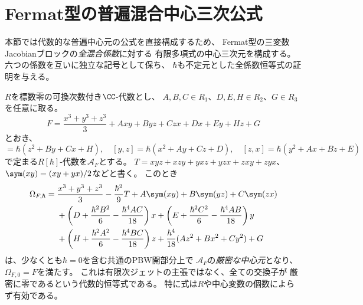 \section{Fermat型の普遍混合中心三次公式}
\label{sec:pg-fermat-mixed-universal}
本節では代数的な普遍中心元の公式を直接構成するため、
Fermat型の三変数Jacobianブロックの\emph{全混合係数}に対する
有限多項式の中心三次元を構成する。
六つの係数を互いに独立な記号として保ち、
$\hbar$も不定元とした全係数恒等式の証明を与える。

\begin{theorem}[普遍Fermat混合中心三次元]
\label{thm:pg-fermat-mixed-universal}
$R$を標数零の可換次数付き$\CC$-代数とし、
$A,B,C\in R_1$、$D,E,H\in R_2$、$G\in R_3$を任意に取る。
\begin{equation}
 F=\frac{x^3+y^3+z^3}{3}
   +Axy+Byz+Czx+Dx+Ey+Hz+G
 \label{eq:pg-fermat-mixed-F}
\end{equation}
とおき、
\begin{equation}
 [x,y]=\hbar(z^2+By+Cx+H),\quad
 [y,z]=\hbar(x^2+Ay+Cz+D),\quad
 [z,x]=\hbar(y^2+Ax+Bz+E)
 \label{eq:pg-fermat-mixed-rel}
\end{equation}
で定まる$R[\hbar]$-代数を$\mathcal A_F$とする。
$T=xyz+xzy+yxz+yzx+zxy+zyx$、
$\sym(xy)=(xy+yx)/2$などと書く。
このとき
\begin{align}
\Omega_{F,\hbar}={}&
 \frac{x^3+y^3+z^3}{3}-\frac{\hbar^2}{9}T
 +A\sym(xy)+B\sym(yz)+C\sym(zx)\notag\\
 &+\left(D+\frac{\hbar^2B^2}{6}-\frac{\hbar^4AC}{18}\right)x
 +\left(E+\frac{\hbar^2C^2}{6}-\frac{\hbar^4AB}{18}\right)y\notag\\
 &+\left(H+\frac{\hbar^2A^2}{6}-\frac{\hbar^4BC}{18}\right)z
 +\frac{\hbar^4}{18}(Az^2+Bx^2+Cy^2)+G
 \label{eq:pg-fermat-mixed-Omega}
\end{align}
は、少なくとも$\hbar=0$を含む共通のPBW開部分上で
$\mathcal A_F$の\emph{厳密な中心元}となり、
$\Omega_{F,0}=F$を満たす。
これは有限次ジェットの主張ではなく、全ての交換子が
厳密に零であるという代数的恒等式である。
特に式は$R$や中心変数の個数によらず有効である。
\end{theorem}
